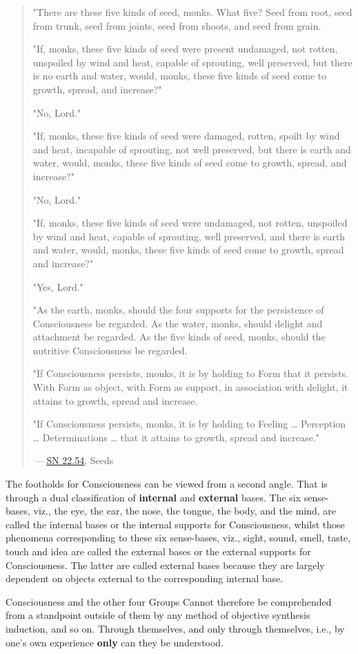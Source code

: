 \begin{quote}
"There are these five kinds of seed, monks. What five? Seed from root, seed from trunk, seed from joints, seed from shoots, and seed from grain.

"If, monks, these five kinds of seed were present undamaged, not rotten, unspoiled by wind and heat, capable of sprouting, well preserved, but there is no earth and water, would, monks, these five kinds of seed come to growth, spread, and increase?"

"No, Lord."

"If, monks, these five kinds of seed were damaged, rotten, spoilt by wind and heat, incapable of sprouting, not well preserved, but there is earth and water, would, monks, these five kinds of seed come to growth, spread, and increase?"

"No, Lord."

"If, monks, these five kinds of seed were undamaged, not rotten, unspoiled by wind and heat, capable of sprouting, well preserved, and there is earth and water, would, monks, these five kinds of seed come to growth, spread and increase?"

"Yes, Lord."

"As the earth, monks, should the four supports for the persistence of Consciousness be regarded. As the water, monks, should delight and attachment be regarded. As the five kinds of seed, monks, should the nutritive Consciousness be regarded.

"If Consciousness persists, monks, it is by holding to Form that it persists. With Form as object, with Form as support, in association with delight, it attains to growth, spread and increase.

"If Consciousness persists, monks, it is by holding to Feeling \ldots{} Perception \ldots{} Determinations \ldots{} that it attains to growth, spread and increase."

 --- \href{https://suttacentral.net/sn22.54/en/bodhi}{SN 22.54}, Seeds
\end{quote}

The footholds for Consciousness can be viewed from a second angle. That is through a dual classification of \textbf{internal} and \textbf{external} bases. The six sense-bases, viz., the eye, the ear, the nose, the tongue, the body, and the mind, are called the internal bases or the internal supports for Consciousness, whilst those phenomena corresponding to these six sense-bases, viz., sight, sound, smell, taste, touch and idea are called the external bases or the external supports for Consciousness. The latter are called external bases because they are largely dependent on objects external to the corresponding internal base.

Consciousness and the other four Groups Cannot therefore be comprehended from a standpoint outside of them by any method of objective synthesis induction, and so on. Through themselves, and only through themselves, i.e., by one's own experience \textbf{only} can they be understood.
